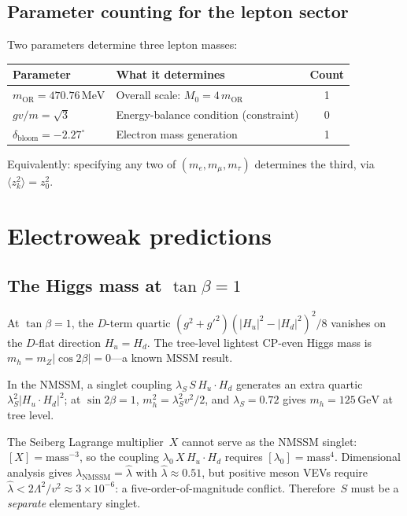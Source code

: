 \documentclass[12pt,a4paper]{article}
\newcommand{\MeV}{\,\text{MeV}}
\newcommand{\GeV}{\,\text{GeV}}
\begin{document}
\subsection{Parameter counting for the lepton sector}

Two parameters determine three lepton masses:
\begin{center}
\begin{tabular}{llc}
\toprule
Parameter & What it determines & Count \\
\midrule
$m_{\text{OR}} = 470.76\MeV$ & Overall scale: $M_0 = 4\,m_{\text{OR}}$ & 1 \\
$gv/m = \sqrt{3}$ & Energy-balance condition (constraint) & 0 \\
$\delta_{\text{bloom}} = -2.27^\circ$ & Electron mass generation & 1 \\
\bottomrule
\end{tabular}
\end{center}
Equivalently: specifying any two of $(m_e, m_\mu, m_\tau)$ determines
the third, via $\langle z_k^2\rangle = z_0^2$.


\section{Electroweak predictions}
\label{sec:electroweak}

\subsection{The Higgs mass at $\tan\beta = 1$}

At $\tan\beta = 1$, the $D$-term quartic
$(g^2+g'^2)(|H_u|^2 - |H_d|^2)^2/8$ vanishes on the
$D$-flat direction $H_u = H_d$. The tree-level lightest
CP-even Higgs mass is $m_h = m_Z|\cos 2\beta| = 0$---a known
MSSM result.

In the NMSSM, a singlet coupling
$\lambda_S\,S\,H_u\!\cdot\!H_d$ generates an extra quartic
$\lambda_S^2|H_u\!\cdot\!H_d|^2$; at $\sin 2\beta = 1$,
$m_h^2 = \lambda_S^2 v^2/2$, and
$\lambda_S = 0.72$ gives $m_h = 125\GeV$ at tree level.

The Seiberg Lagrange multiplier~$X$ cannot serve as the NMSSM
singlet: $[X] = \text{mass}^{-3}$, so the coupling
$\lambda_0\,X\,H_u\!\cdot\!H_d$ requires
$[\lambda_0] = \text{mass}^4$. Dimensional analysis gives
$\lambda_{\text{NMSSM}} = \hat\lambda$ with
$\hat\lambda \approx 0.51$, but positive meson VEVs
require $\hat\lambda < 2\Lambda^2/v^2 \approx 3\times 10^{-6}$:
a five-order-of-magnitude conflict. Therefore~$S$ must be a
\emph{separate} elementary singlet.
\end{document}
